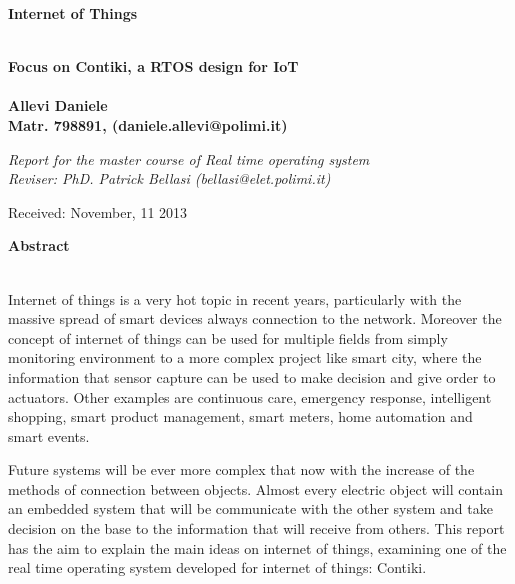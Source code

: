 \documentclass[a4paper,10pt]{article}
\newenvironment*{mytitle}{\begin{LARGE}\bf}{\end{LARGE}\\}%
\newenvironment*{mysubtitle}{\bf}{\\[1.5ex]}%
\newenvironment*{myabstract}{\begin{Large}\bf}{\end{Large}\\[2.5ex]}%
\begin{document}
\begin{mytitle}Internet of Things\end{mytitle}
\begin{mysubtitle}Focus on Contiki, a RTOS design for IoT\end{mysubtitle}
%
%
\\
Allevi Daniele\\
Matr. 798891, (daniele.allevi@polimi.it)\\
\hspace{10ex}
\begin{flushright}
\emph{Report for the master course of Real time operating system}\\
\emph{Reviser: PhD. Patrick Bellasi (bellasi@elet.polimi.it)}
\end{flushright}

Received: November, 11 2013\\
\hspace{10ex}

\begin{myabstract} Abstract \end{myabstract}
Internet of things is a very hot topic in recent years, particularly with the massive spread of smart devices always connection to the network. Moreover the concept of internet of things can be used for multiple fields from simply monitoring  environment to a more complex project like smart city, where the information that sensor capture can be used to make decision and give order to actuators. Other examples are continuous care, emergency response, intelligent shopping, smart product management, smart meters, home automation and smart events.

 Future systems will be ever more complex that now with the increase of the methods of connection between objects. Almost every electric object will contain an embedded system that will be communicate with the other system and take decision on the base to the information that will receive from others. This report has the aim to explain the main ideas on internet of things, examining one of the real time operating system developed for internet of things: Contiki.
\end{document}
